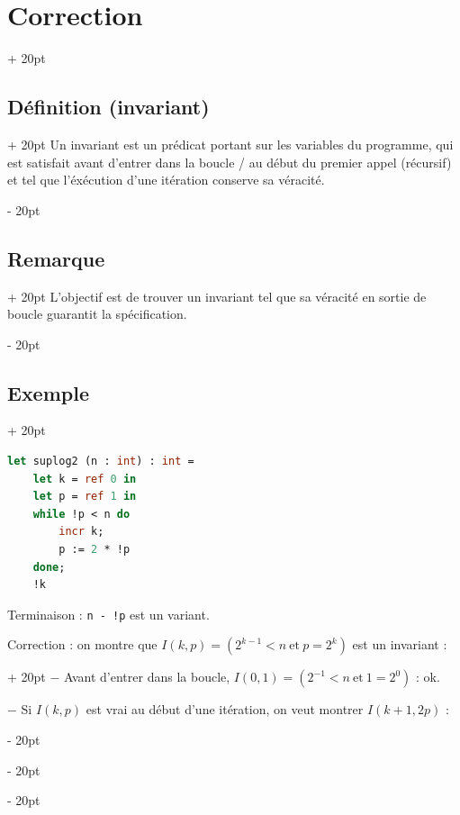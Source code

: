 \documentclass[a4paper, 12pt, twoside]{article}
\newcommand{\ind}[1][20pt]{\advance\leftskip + #1}
\newcommand{\deind}[1][20pt]{\advance\leftskip - #1}
\newenvironment{indentedenv}[1][20pt]{\par \ind[#1]}{\par \deind}
\newenvironment{indt}[2][20pt]{#2 \begin{indentedenv}[#1]}{\end{indentedenv}} %
\begin{document}
\begin{indt}{\section{Correction}}
        \vspace{6pt}
        
        \begin{indt}{\subsection{Définition (invariant)}}
            Un invariant est un prédicat portant sur les variables du programme, qui est satisfait avant d'entrer dans la boucle / au début du premier appel (récursif) et tel que l'éxécution d'une itération conserve sa véracité.
        \end{indt}
        
        \vspace{6pt}
        
        \begin{indt}{\subsection{Remarque}}
            L'objectif est de trouver un invariant tel que sa véracité en sortie de boucle guarantit la spécification.
        \end{indt}
        
        \vspace{6pt}
        
        \begin{indt}{\subsection{Exemple}}
            \begin{lstlisting}[language=Caml, xleftmargin=60pt]
let suplog2 (n : int) : int =
    let k = ref 0 in
    let p = ref 1 in
    while !p < n do
        incr k;
        p := 2 * !p
    done;
    !k
            \end{lstlisting}
            
            Terminaison : \texttt{n - !p} est un variant.
            
            \vspace{6pt}
            
            \begin{indt}{Correction : on montre que $I(k, p) = (2^{k - 1} < n\ \text{et}\ p = 2^k)$ est un invariant :}
                $-$ Avant d'entrer dans la boucle, $I(0, 1) = (2^{-1} < n\ \text{et}\ 1 = 2^0)$ : ok.
                
                $-$ Si $I(k, p)$ est vrai au début d'une itération, on veut montrer $I(k + 1, 2p)$ :
                

\end{indt}
\end{indt}
\end{indt}
\end{document}
